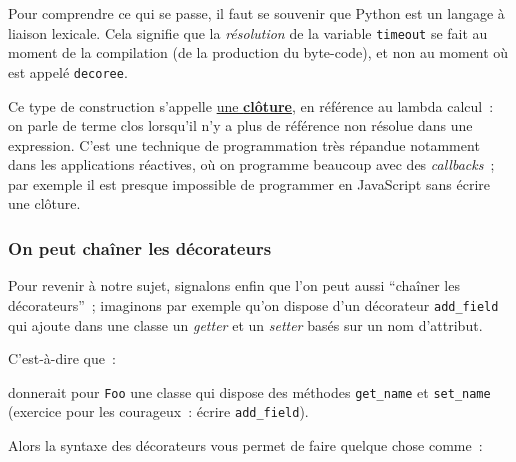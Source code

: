 Pour comprendre ce qui se passe, il faut se souvenir que Python est un
langage à liaison lexicale. Cela signifie que la \emph{résolution} de la
variable \texttt{timeout} se fait au moment de la compilation (de la
production du byte-code), et non au moment où est appelé
\texttt{decoree}.

Ce type de construction s'appelle
\href{http://fr.wikipedia.org/wiki/Fermeture_\%28informatique\%29}{une
\textbf{clôture}}, en référence au lambda calcul~: on parle de terme
clos lorsqu'il n'y a plus de référence non résolue dans une expression.
C'est une technique de programmation très répandue notamment dans les
applications réactives, où on programme beaucoup avec des
\emph{callbacks}~; par exemple il est presque impossible de programmer
en JavaScript sans écrire une clôture.

    \hypertarget{on-peut-chauxeener-les-duxe9corateurs}{%
\subsubsection{On peut chaîner les
décorateurs}\label{on-peut-chauxeener-les-duxe9corateurs}}

    Pour revenir à notre sujet, signalons enfin que l'on peut aussi
``chaîner les décorateurs''~; imaginons par exemple qu'on dispose d'un
décorateur \texttt{add\_field} qui ajoute dans une classe un
\emph{getter} et un \emph{setter} basés sur un nom d'attribut.

C'est-à-dire que~:

\begin{Shaded}
\begin{Highlighting}[frame=lines,framerule=0.6mm,rulecolor=\color{asisframecolor}]
\NormalTok{(}\NormalTok{)}
\end{Highlighting}
\end{Shaded}

donnerait pour \texttt{Foo} une classe qui dispose des méthodes
\texttt{get\_name} et \texttt{set\_name} (exercice pour les courageux~:
écrire \texttt{add\_field}).

    Alors la syntaxe des décorateurs vous permet de faire quelque chose
comme~:

\begin{Shaded}
\begin{Highlighting}[frame=lines,framerule=0.6mm,rulecolor=\color{asisframecolor}]
\NormalTok{(}\NormalTok{)}
\NormalTok{(}\NormalTok{)}
\end{Highlighting}
\end{Shaded}

